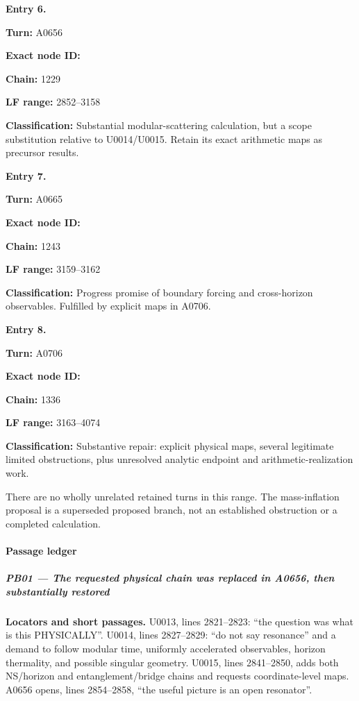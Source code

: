 \textbf{Entry 6.}

\textbf{Turn:} A0656

\textbf{Exact node ID:}
\protect{}

\textbf{Chain:} 1229

\textbf{LF range:} 2852--3158

\textbf{Classification:} Substantial modular-scattering calculation, but
a scope substitution relative to U0014/U0015. Retain its exact
arithmetic maps as precursor results.


\textbf{Entry 7.}

\textbf{Turn:} A0665

\textbf{Exact node ID:}
\protect{}

\textbf{Chain:} 1243

\textbf{LF range:} 3159--3162

\textbf{Classification:} Progress promise of boundary forcing and
cross-horizon observables. Fulfilled by explicit maps in A0706.


\textbf{Entry 8.}

\textbf{Turn:} A0706

\textbf{Exact node ID:}
\protect{}

\textbf{Chain:} 1336

\textbf{LF range:} 3163--4074

\textbf{Classification:} Substantive repair: explicit physical maps,
several legitimate limited obstructions, plus unresolved analytic
endpoint and arithmetic-realization work.

There are no wholly unrelated retained turns in this range. The
mass-inflation proposal is a superseded proposed branch, not an
established obstruction or a completed calculation.

\paragraph{Passage ledger}\label{passage-ledger-1}

\subparagraph{PB01 --- The requested physical chain was replaced in
A0656, then substantially
restored}\label{pb01-the-requested-physical-chain-was-replaced-in-a0656-then-substantially-restored}

\textbf{Locators and short passages.} U0013, lines 2821--2823: ``the
question was what is this PHYSICALLY''. U0014, lines 2827--2829: ``do
not say resonance'' and a demand to follow modular time, uniformly
accelerated observables, horizon thermality, and possible singular
geometry. U0015, lines 2841--2850, adds both NS/horizon and
entanglement/bridge chains and requests coordinate-level maps. A0656
opens, lines 2854--2858, ``the useful picture is an open resonator''.

